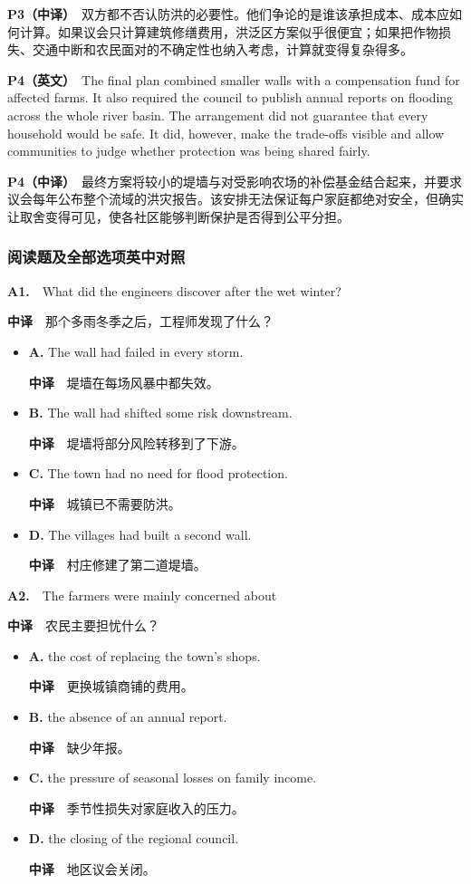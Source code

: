 \documentclass[
  11pt,
]{ctexart}
\begin{document}
\textbf{P3（中译）}　双方都不否认防洪的必要性。他们争论的是谁该承担成本、成本应如何计算。如果议会只计算建筑修缮费用，洪泛区方案似乎很便宜；如果把作物损失、交通中断和农民面对的不确定性也纳入考虑，计算就变得复杂得多。

\textbf{P4（英文）}　The final plan combined smaller walls with a
compensation fund for affected farms. It also required the council to
publish annual reports on flooding across the whole river basin. The
arrangement did not guarantee that every household would be safe. It
did, however, make the trade-offs visible and allow communities to judge
whether protection was being shared fairly.

\textbf{P4（中译）}　最终方案将较小的堤墙与对受影响农场的补偿基金结合起来，并要求议会每年公布整个流域的洪灾报告。该安排无法保证每户家庭都绝对安全，但确实让取舍变得可见，使各社区能够判断保护是否得到公平分担。

\subsubsection{阅读题及全部选项英中对照}\label{ux9605ux8bfbux9898ux53caux5168ux90e8ux9009ux9879ux82f1ux4e2dux5bf9ux7167}

\textbf{A1.}　What did the engineers discover after the wet winter?

\textbf{中译}　那个多雨冬季之后，工程师发现了什么？

\begin{itemize}
\item
  \textbf{A.} The wall had failed in every storm.

  \textbf{中译}　堤墙在每场风暴中都失效。
\item
  \textbf{B.} The wall had shifted some risk downstream.

  \textbf{中译}　堤墙将部分风险转移到了下游。
\item
  \textbf{C.} The town had no need for flood protection.

  \textbf{中译}　城镇已不需要防洪。
\item
  \textbf{D.} The villages had built a second wall.

  \textbf{中译}　村庄修建了第二道堤墙。
\end{itemize}

\textbf{A2.}　The farmers were mainly concerned about

\textbf{中译}　农民主要担忧什么？

\begin{itemize}
\item
  \textbf{A.} the cost of replacing the town's shops.

  \textbf{中译}　更换城镇商铺的费用。
\item
  \textbf{B.} the absence of an annual report.

  \textbf{中译}　缺少年报。
\item
  \textbf{C.} the pressure of seasonal losses on family income.

  \textbf{中译}　季节性损失对家庭收入的压力。
\item
  \textbf{D.} the closing of the regional council.

  \textbf{中译}　地区议会关闭。
\end{itemize}
\end{document}
